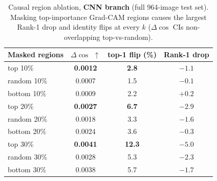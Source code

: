 \documentclass[11pt]{article}
\begin{document}
\begin{table}[t]
  \centering
  \caption{Causal region ablation, \textbf{CNN branch} (full 964-image test set). Masking
  top-importance Grad-CAM regions causes the largest Rank-1 drop and identity flips at every
  $k$ ($\Delta\cos$ CIs non-overlapping top-vs-random).}
  \label{tab:ablation-cnn}
  \small
  \begin{tabular}{lccc}
    \toprule
    Masked regions & $\Delta\cos$ $\uparrow$ & top-1 flip (\%) & Rank-1 drop \\
    \midrule
    top 10\%    & \textbf{0.0012} & \textbf{2.8} & \textbf{$-1.1$} \\
    random 10\% & 0.0007 & 1.5 & $-0.1$ \\
    bottom 10\% & 0.0009 & 2.2 & $+0.2$ \\
    \midrule
    top 20\%    & \textbf{0.0027} & \textbf{6.7} & \textbf{$-2.9$} \\
    random 20\% & 0.0018 & 3.3 & $-1.6$ \\
    bottom 20\% & 0.0024 & 3.6 & $-0.3$ \\
    \midrule
    top 30\%    & \textbf{0.0041} & \textbf{12.3} & \textbf{$-5.0$} \\
    random 30\% & 0.0028 & 5.3 & $-2.3$ \\
    bottom 30\% & 0.0038 & 5.7 & $-1.7$ \\
    \bottomrule
  \end{tabular}
\end{table}
\end{document}
